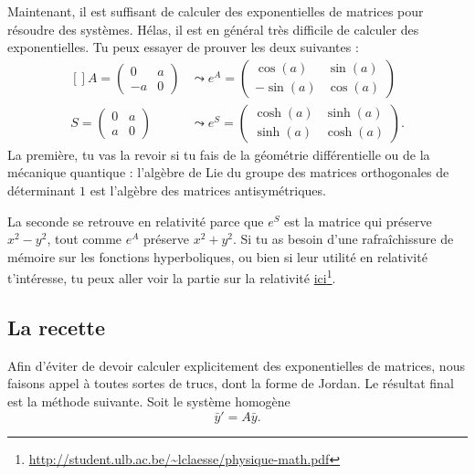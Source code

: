 Maintenant, il est suffisant de calculer des exponentielles de matrices pour résoudre des systèmes. Hélas, il est en général très difficile de calculer des exponentielles. Tu peux essayer de prouver les deux suivantes :
\begin{equation}
	\begin{aligned}[]
		A=\begin{pmatrix}
	0	&	a	\\ 
	-a	&	0	
\end{pmatrix}	&\leadsto  e^{A}=\begin{pmatrix}
	\cos(a)	&	\sin(a)	\\ 
	-\sin(a)	&	\cos(a)	
\end{pmatrix}\\
		S=\begin{pmatrix}
	0	&	a	\\ 
	a	&	0	
\end{pmatrix}	&\leadsto  e^{S}=\begin{pmatrix}
	\cosh(a)	&	\sinh(a)	\\ 
	\sinh(a)	&	\cosh(a)	
\end{pmatrix}.
	\end{aligned}
\end{equation}
La première, tu vas la revoir si tu fais de la géométrie différentielle ou de la mécanique quantique : l'algèbre de Lie du groupe des matrices orthogonales de déterminant $1$ est l'algèbre des matrices antisymétriques.

La seconde se retrouve en relativité parce que $e^S$ est la matrice qui préserve $x^2-y^2$, tout comme $e^A$ préserve $x^2+y^2$. Si tu as besoin d'une rafraîchissure de mémoire sur les fonctions hyperboliques, ou bien si leur utilité en relativité t'intéresse, tu peux aller voir la partie sur la relativité \href{http://student.ulb.ac.be/~lclaesse/physique-math.pdf}{ici}\footnote{ \url{http://student.ulb.ac.be/~lclaesse/physique-math.pdf}}.

					\subsection{La recette}

Afin d'éviter de devoir calculer explicitement des exponentielles de matrices, nous faisons appel à toutes sortes de trucs, dont la forme de Jordan. Le résultat final est la méthode suivante. Soit le système homogène
\begin{equation}
	\bar y'=A\bar y.
\end{equation}

